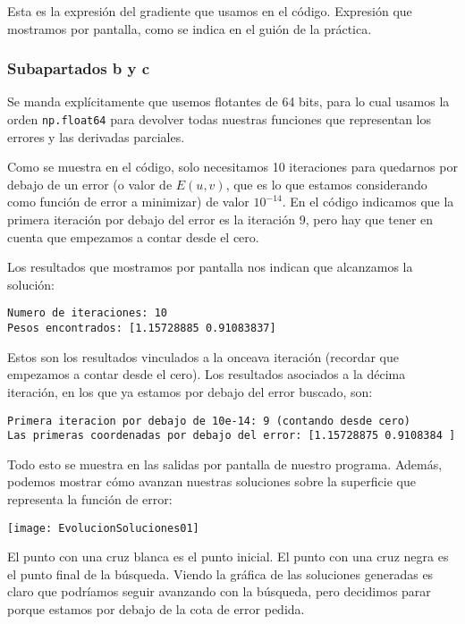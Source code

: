 \documentclass[11pt]{article}
\begin{document}
Esta es la expresión del gradiente que usamos en el código. Expresión que mostramos por pantalla, como se indica en el guión de la práctica.

\subsubsection{Subapartados b y c}

Se manda explícitamente que usemos flotantes de 64 bits, para lo cual usamos la orden \lstinline{np.float64} para devolver todas nuestras funciones que representan los errores y las derivadas parciales.

Como se muestra en el código, solo necesitamos 10 iteraciones para quedarnos por debajo de un error (o valor de $E(u, v)$, que es lo que estamos considerando como función de error a minimizar) de valor $10^{-14}$. En el código indicamos que la primera iteración por debajo del error es la iteración 9, pero hay que tener en cuenta que empezamos a contar desde el cero.

Los resultados que mostramos por pantalla nos indican que alcanzamos la solución:

\begin{verbatim}
Numero de iteraciones: 10
Pesos encontrados: [1.15728885 0.91083837]
\end{verbatim}

Estos son los resultados vinculados a la onceava iteración (recordar que empezamos a contar desde el cero). Los resultados asociados a la décima iteración, en los que ya estamos por debajo del error buscado, son:

\begin{verbatim}
Primera iteracion por debajo de 10e-14: 9 (contando desde cero)
Las primeras coordenadas por debajo del error: [1.15728875 0.9108384 ]
\end{verbatim}

Todo esto se muestra en las salidas por pantalla de nuestro programa. Además, podemos mostrar cómo avanzan nuestras soluciones sobre la superficie que representa la función de error:

\texttt{[image: EvolucionSoluciones01]}

El punto con una cruz blanca es el punto inicial. El punto con una cruz negra es el punto final de la búsqueda. Viendo la gráfica de las soluciones generadas es claro que podríamos seguir avanzando con la búsqueda, pero decidimos parar porque estamos por debajo de la cota de error pedida.
\end{document}
